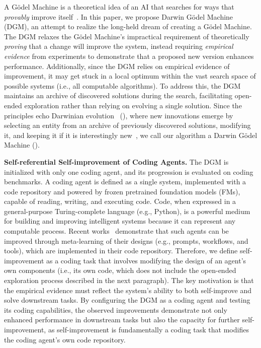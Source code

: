 \documentclass{article}
\begin{document}
A G\"odel Machine is a theoretical idea of an AI that searches for ways that \emph{provably} improve itself~\citep{schmidhuber2007godel}. In this paper, we propose Darwin G\"odel Machine (DGM), an attempt to realize the long-held dream of creating a G\"odel Machine. The DGM relaxes the G\"odel Machine's impractical requirement of theoretically \emph{proving} that a change will improve the system, instead requiring \emph{empirical evidence} from experiments to demonstrate that a proposed new version enhances performance. Additionally, since the DGM relies on empirical evidence of improvement, it may get stuck in a local optimum within the vast search space of possible systems (i.e., all computable algorithms). To address this, the DGM maintains an archive of discovered solutions during the search, facilitating open-ended exploration rather than relying on evolving a single solution. Since the principles echo Darwinian evolution~\citep{darwin2023origin} (), where new innovations emerge by selecting an entity from an archive of previously discovered solutions, modifying it, and keeping it if it is interestingly new~\citep{zhang2024omni, faldor2025omni, stanley2015greatness}, we call our algorithm a Darwin G\"odel Machine ().

\textbf{Self-referential Self-improvement of Coding Agents.}
The DGM is initialized with only one coding agent, and its progression is evaluated on coding benchmarks. A coding agent is defined as a single system, implemented with a code repository and powered by frozen pretrained foundation models (FMs), capable of reading, writing, and executing code. Code, when expressed in a general-purpose Turing-complete language (e.g., Python), is a powerful medium for building and improving intelligent systems because it can represent any computable process. Recent works~\citep{hu2025automated, zhang2024aflow} demonstrate that such agents can be improved through meta-learning of their designs (e.g., prompts, workflows, and tools), which are implemented in their code repository. Therefore, we define self-improvement as a coding task that involves modifying the design of an agent's own components (i.e., its own code, which does not include the open-ended exploration process described in the next paragraph). The key motivation is that the empirical evidence must reflect the system's ability to both self-improve and solve downstream tasks. By configuring the DGM as a coding agent and testing its coding capabilities, the observed improvements demonstrate not only enhanced performance in downstream tasks but also the capacity for further self-improvement, as self-improvement is fundamentally a coding task that modifies the coding agent's own code repository.
\end{document}

